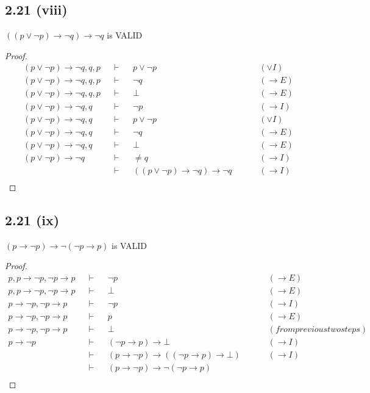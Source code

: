 \documentclass[12pt]{article}
\begin{document}
\subsection*{2.21 (viii)} 
$((p \vee \neg p) \rightarrow \neg q) \rightarrow \neg q$ is VALID
\begin{proof}
\begin{align*}
    (p \vee \neg p) \rightarrow \neg q, q, p &&\vdash&& p \vee \neg p && &&(\vee I)\\
    (p \vee \neg p) \rightarrow \neg q, q, p &&\vdash&& \neg q && &&(\rightarrow E) \\
    (p \vee \neg p) \rightarrow \neg q, q, p &&\vdash&& \bot && &&(\rightarrow E) \\
    (p \vee \neg p) \rightarrow \neg q, q &&\vdash&& \neg p && &&(\rightarrow I) \\
    (p \vee \neg p) \rightarrow \neg q, q &&\vdash&& p \vee \neg p && &&(\vee I) \\
    (p \vee \neg p) \rightarrow \neg q, q &&\vdash&& \neg q && &&(\rightarrow E) \\
    (p \vee \neg p) \rightarrow \neg q, q &&\vdash&& \bot && &&(\rightarrow E) \\
    (p \vee \neg p) \rightarrow \neg q &&\vdash&& \neq q && &&(\rightarrow I) \\
    &&\vdash&& ((p \vee \neg p) \rightarrow \neg q) \rightarrow \neg q && &&(\rightarrow I) \\
\end{align*}
\end{proof}

\subsection*{2.21 (ix)} 
$(p \rightarrow \neg p) \rightarrow \neg (\neg p \rightarrow p)$ is VALID
\begin{proof}
\begin{align*}
    p, p \rightarrow \neg p, \neg p \rightarrow p &&\vdash&& \neg p && &&(\rightarrow E) \\
    p, p \rightarrow \neg p, \neg p \rightarrow p &&\vdash&& \bot && &&(\rightarrow E) \\
    p \rightarrow \neg p, \neg p \rightarrow p &&\vdash&& \neg p && &&(\rightarrow I) \\
    p \rightarrow \neg p, \neg p \rightarrow p &&\vdash&& p && &&(\rightarrow E) \\
    p \rightarrow \neg p, \neg p \rightarrow p &&\vdash&& \bot && &&(from previous two steps) \\
    p \rightarrow \neg p &&\vdash&& (\neg p \rightarrow p) \rightarrow \bot && &&(\rightarrow I) \\
    &&\vdash&& (p \rightarrow \neg p) \rightarrow ((\neg p \rightarrow p) \rightarrow \bot) && &&(\rightarrow I) \\
    &&\vdash&& (p \rightarrow \neg p) \rightarrow \neg (\neg p \rightarrow p) && && \\
\end{align*}
\end{proof}
\end{document}
